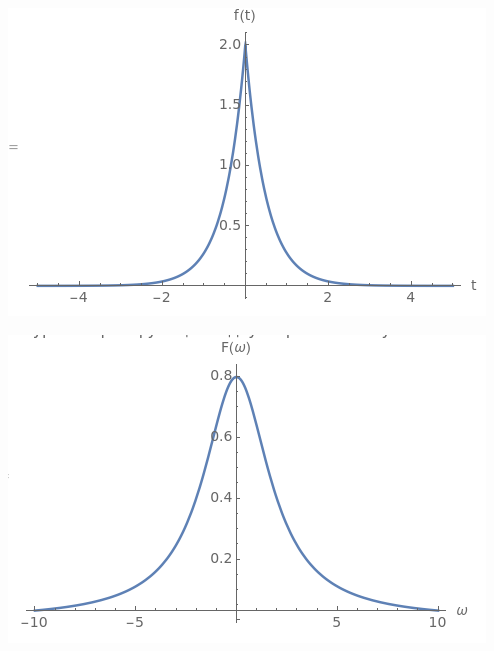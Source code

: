 \documentclass[a4paper,12pt]{article}
\begin{document}
\begin{center}
\begin{minipage}{0.48\textwidth}
  \centering
  \includegraphics[width=\linewidth]{images/5f22.png}
\end{minipage}
\hfill
\begin{minipage}{0.48\textwidth}
  \centering
  \includegraphics[width=\linewidth]{images/5F22.png}
\end{minipage}
\end{center}
\end{document}
